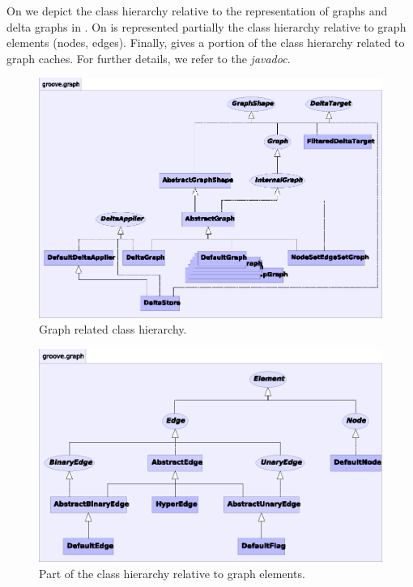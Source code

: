 On  we depict the class hierarchy relative to the
representation of graphs and delta graphs in \GROOVE. On  is
represented partially the class hierarchy relative to graph elements
(nodes, edges). Finally,  gives a portion of the class
hierarchy related to graph caches. For further details, we refer to the
{\em javadoc}.
\begin{figure}[ht]
  \centering
  \includegraphics{fig/graphs}
  \caption{Graph related class hierarchy.}
\end{figure}

\begin{figure}[ht]
  \centering
  \includegraphics{fig/elements}
  \caption{Part of the class hierarchy relative to graph elements.}
\end{figure}

